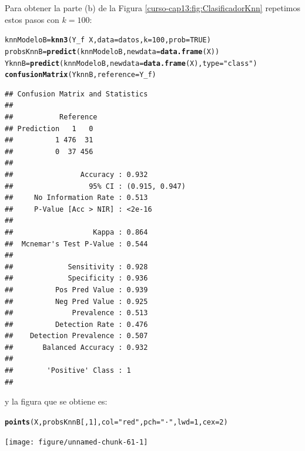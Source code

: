 \documentclass[10pt,a4paper]{article}\usepackage[]{graphicx}\usepackage[]{color}
\makeatletter
\newcommand{\hlnum}[1]{\textcolor[rgb]{0.686,0.059,0.569}{#1}}%
\newcommand{\hlstr}[1]{\textcolor[rgb]{0.192,0.494,0.8}{#1}}%
\newcommand{\hlopt}[1]{\textcolor[rgb]{0,0,0}{#1}}%
\newcommand{\hlstd}[1]{\textcolor[rgb]{0.345,0.345,0.345}{#1}}%
\newcommand{\hlkwb}[1]{\textcolor[rgb]{0.69,0.353,0.396}{#1}}%
\newcommand{\hlkwc}[1]{\textcolor[rgb]{0.333,0.667,0.333}{#1}}%
\newcommand{\hlkwd}[1]{\textcolor[rgb]{0.737,0.353,0.396}{\textbf{#1}}}%
\newenvironment{kframe}{%
 \def\at@end@of@kframe{}%
 \ifinner\ifhmode%
  \def\at@end@of@kframe{\end{minipage}}%
  \begin{minipage}{\columnwidth}%
 \fi\fi%
 \def\FrameCommand##1{\hskip\@totalleftmargin \hskip-\fboxsep
 \colorbox{shadecolor}{##1}\hskip-\fboxsep
     \hskip-\linewidth \hskip-\@totalleftmargin \hskip\columnwidth}%
 \MakeFramed {\advance\hsize-\width
   \@totalleftmargin\z@ \linewidth\hsize
   \@setminipage}}%
 {\par\unskip\endMakeFramed%
 \at@end@of@kframe}
\newenvironment{knitrout}{}{} %
\makeatother
\begin{document}
Para obtener la parte (b) de la Figura \ref{curso-cap13:fig:ClasificadorKnn} repetimos estos pasos con $k=100$:

\begin{knitrout}
\color{fgcolor}\begin{kframe}
\begin{alltt}
\hlstd{knnModeloB} \hlkwb{=} \hlkwd{knn3}\hlstd{(Y_f} \hlopt{~} \hlstd{X,} \hlkwc{data} \hlstd{= datos,} \hlkwc{k}\hlstd{=}\hlnum{100}\hlstd{,} \hlkwc{prob}\hlstd{=}\hlnum{TRUE}\hlstd{)}
\hlstd{probsKnnB} \hlkwb{=} \hlkwd{predict}\hlstd{(knnModeloB,} \hlkwc{newdata} \hlstd{=} \hlkwd{data.frame}\hlstd{(X))}
\hlstd{YknnB} \hlkwb{=} \hlkwd{predict}\hlstd{(knnModeloB,} \hlkwc{newdata} \hlstd{=} \hlkwd{data.frame}\hlstd{(X),} \hlkwc{type}\hlstd{=}\hlstr{"class"}\hlstd{)}
\hlkwd{confusionMatrix}\hlstd{(YknnB,} \hlkwc{reference} \hlstd{= Y_f)}
\end{alltt}
\begin{verbatim}
## Confusion Matrix and Statistics
## 
##           Reference
## Prediction   1   0
##          1 476  31
##          0  37 456
##                                         
##                Accuracy : 0.932         
##                  95% CI : (0.915, 0.947)
##     No Information Rate : 0.513         
##     P-Value [Acc > NIR] : <2e-16        
##                                         
##                   Kappa : 0.864         
##  Mcnemar's Test P-Value : 0.544         
##                                         
##             Sensitivity : 0.928         
##             Specificity : 0.936         
##          Pos Pred Value : 0.939         
##          Neg Pred Value : 0.925         
##              Prevalence : 0.513         
##          Detection Rate : 0.476         
##    Detection Prevalence : 0.507         
##       Balanced Accuracy : 0.932         
##                                         
##        'Positive' Class : 1             
## 
\end{verbatim}
\end{kframe}
\end{knitrout}

y la figura que se obtiene es:

\begin{knitrout}
\color{fgcolor}\begin{kframe}
\begin{alltt}
\hlkwd{points}\hlstd{(X, probsKnnB[ ,} \hlnum{1}\hlstd{],} \hlkwc{col}\hlstd{=}\hlstr{"red"}\hlstd{,} \hlkwc{pch}\hlstd{=}\hlstr{"·"}\hlstd{,} \hlkwc{lwd}\hlstd{=}\hlnum{1}\hlstd{,} \hlkwc{cex}\hlstd{=}\hlnum{2}\hlstd{)}
\end{alltt}
\end{kframe}

{\centering \texttt{[image: figure/unnamed-chunk-61-1]} 

}



\end{knitrout}
\end{document}
